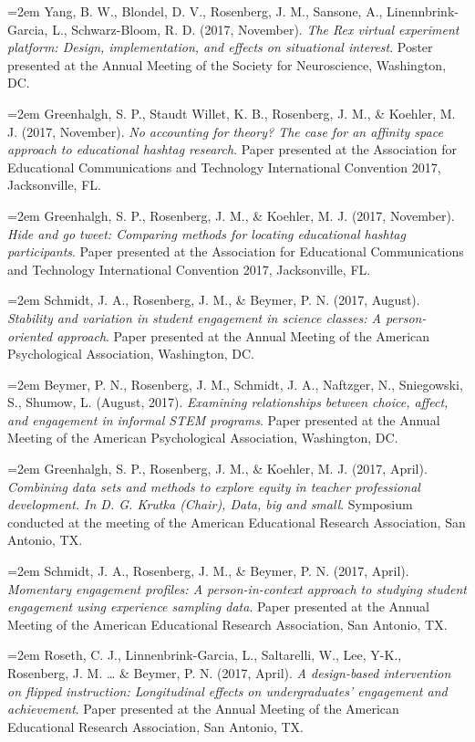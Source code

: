 \documentclass[
  11pt,
]{article}
\begin{document}
\hangindent=2em Yang, B. W., Blondel, D. V., Rosenberg, J. M., Sansone,
A., Linennbrink-Garcia, L., Schwarz-Bloom, R. D. (2017, November).
\emph{The Rex virtual experiment platform: Design, implementation, and
effects on situational interest}. Poster presented at the Annual Meeting
of the Society for Neuroscience, Washington, DC.

\hangindent=2em Greenhalgh, S. P., Staudt Willet, K. B., Rosenberg, J.
M., \& Koehler, M. J. (2017, November). \emph{No accounting for theory?
The case for an affinity space approach to educational hashtag
research}. Paper presented at the Association for Educational
Communications and Technology International Convention 2017,
Jacksonville, FL.

\hangindent=2em Greenhalgh, S. P., Rosenberg, J. M., \& Koehler, M. J.
(2017, November). \emph{Hide and go tweet: Comparing methods for
locating educational hashtag participants}. Paper presented at the
Association for Educational Communications and Technology International
Convention 2017, Jacksonville, FL.

\hangindent=2em Schmidt, J. A., Rosenberg, J. M., \& Beymer, P. N.
(2017, August). \emph{Stability and variation in student engagement in
science classes: A person-oriented approach}. Paper presented at the
Annual Meeting of the American Psychological Association, Washington,
DC.

\hangindent=2em Beymer, P. N., Rosenberg, J. M., Schmidt, J. A.,
Naftzger, N., Sniegowski, S., Shumow, L. (August, 2017). \emph{Examining
relationships between choice, affect, and engagement in informal STEM
programs}. Paper presented at the Annual Meeting of the American
Psychological Association, Washington, DC.

\hangindent=2em Greenhalgh, S. P., Rosenberg, J. M., \& Koehler, M. J.
(2017, April). \emph{Combining data sets and methods to explore equity
in teacher professional development. In D. G. Krutka (Chair), Data, big
and small}. Symposium conducted at the meeting of the American
Educational Research Association, San Antonio, TX.

\hangindent=2em Schmidt, J. A., Rosenberg, J. M., \& Beymer, P. N.
(2017, April). \emph{Momentary engagement profiles: A person-in-context
approach to studying student engagement using experience sampling data}.
Paper presented at the Annual Meeting of the American Educational
Research Association, San Antonio, TX.

\hangindent=2em Roseth, C. J., Linnenbrink-Garcia, L., Saltarelli, W.,
Lee, Y-K., Rosenberg, J. M. \ldots{} \& Beymer, P. N. (2017, April).
\emph{A design-based intervention on flipped instruction: Longitudinal
effects on undergraduates' engagement and achievement}. Paper presented
at the Annual Meeting of the American Educational Research Association,
San Antonio, TX.
\end{document}
